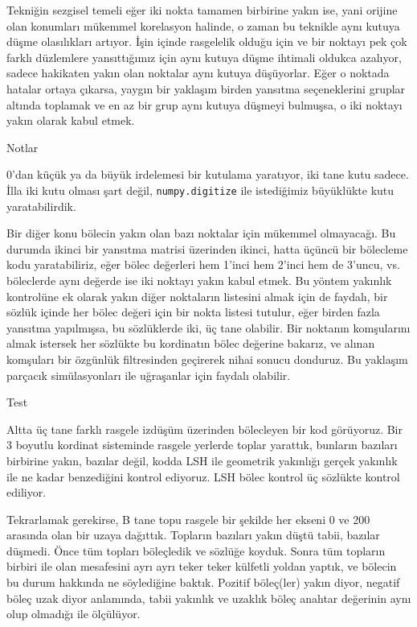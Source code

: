 \documentclass[12pt,fleqn]{article}\usepackage{../../common}
\begin{document}
Tekniğin sezgisel temeli eğer iki nokta tamamen birbirine yakın ise, yani
orijine olan konumları mükemmel korelasyon halinde, o zaman bu teknikle aynı
kutuya düşme olasılıkları artıyor. İşin içinde rasgelelik olduğu için ve bir
noktayı pek çok farklı düzlemlere yansıttığımız için aynı kutuya düşme ihtimali
oldukca azalıyor, sadece hakikaten yakın olan noktalar aynı kutuya
düşüyorlar. Eğer o noktada hatalar ortaya çıkarsa, yaygın bir yaklaşım birden
yansıtma seçeneklerini gruplar altında toplamak ve en az bir grup aynı kutuya
düşmeyi bulmuşsa, o iki noktayı yakın olarak kabul etmek.

Notlar

0'dan küçük ya da büyük irdelemesi bir kutulama yaratıyor, iki tane kutu
sadece. İlla iki kutu olması şart değil, \verb!numpy.digitize! ile istediğimiz
büyüklükte kutu yaratabilirdik.

Bir diğer konu bölecin yakın olan bazı noktalar için mükemmel olmayacağı. Bu
durumda ikinci bir yansıtma matrisi üzerinden ikinci, hatta üçüncü bir bölecleme
kodu yaratabiliriz, eğer bölec değerleri hem 1'inci hem 2'inci hem de 3'uncu,
vs. böleclerde aynı değerde ise iki noktayı yakın kabul etmek. Bu yöntem
yakınlık kontrolüne ek olarak yakın diğer noktaların listesini almak için de
faydalı, bir sözlük içinde her bölec değeri için bir nokta listesi tutulur, eğer
birden fazla yansıtma yapılmışsa, bu sözlüklerde iki, üç tane olabilir. Bir
noktanın komşularını almak istersek her sözlükte bu kordinatın bölec değerine
bakarız, ve alınan komşuları bir özgünlük filtresinden geçirerek nihai sonucu
donduruz. Bu yaklaşım parçacık simülasyonları ile uğraşanlar için faydalı
olabilir.

Test

Altta üç tane farklı rasgele izdüşüm üzerinden bölecleyen bir kod görüyoruz. Bir
3 boyutlu kordinat sisteminde rasgele yerlerde toplar yarattık, bunların
bazıları birbirine yakın, bazılar değil, kodda LSH ile geometrik yakınlığı
gerçek yakınlık ile ne kadar benzediğini kontrol ediyoruz. LSH bölec kontrol üç
sözlükte kontrol ediliyor.

Tekrarlamak gerekirse, B tane topu rasgele bir şekilde her ekseni 0 ve 200
arasında olan bir uzaya dağıttık. Topların bazıları yakın düştü tabii, bazılar
düşmedi. Önce tüm topları böleçledik ve sözlüğe koyduk. Sonra tüm topların
birbiri ile olan mesafesini ayrı ayrı teker teker külfetli yoldan yaptık, ve
bölecin bu durum hakkında ne söylediğine baktık. Pozitif böleç(ler) yakın diyor,
negatif böleç uzak diyor anlamında, tabii yakınlık ve uzaklık böleç anahtar
değerinin aynı olup olmadığı ile ölçülüyor.
\end{document}
